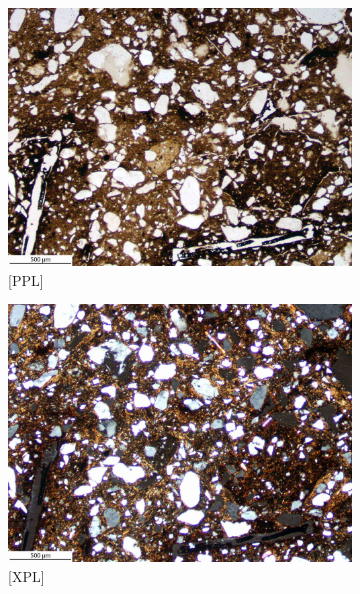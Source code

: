 \documentclass[a4paper]{article}
\begin{document}
\begin{figure}[H]
	\begin{subfigure}[t]{.49\textwidth}
		\includegraphics[width=\textwidth]{ThinSections/48-1_4x_PPL.jpg}
		\caption{[PPL]}
	\end{subfigure}\hspace{.5em}\hfill
	\begin{subfigure}[t]{.49\textwidth}
		\includegraphics[width=\textwidth]{ThinSections/48-1_4x_XPL.jpg}
		\caption{[XPL]}
	\end{subfigure}
	\begin{subfigure}[t]{.32\textwidth}

\end{subfigure}
\end{figure}
\end{document}
